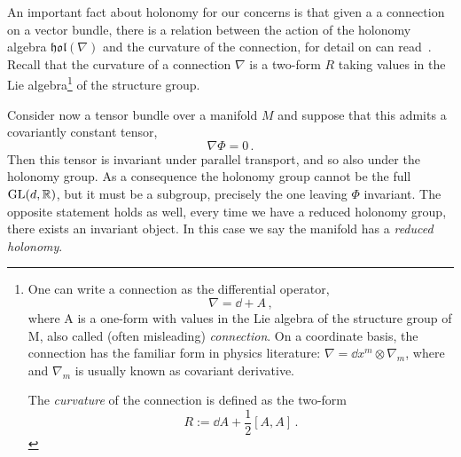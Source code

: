 \documentclass[debug]{phd}
\begin{document}
					An important fact about holonomy for our concerns is that given a a connection on a vector bundle, there is a relation between the action of the holonomy algebra $\mathfrak{hol}(\nabla)$ and the curvature of the connection, for detail on can read~\cite{holon2}.
					Recall that the curvature of a connection $\nabla$ is a two-form $R$ taking values in the Lie algebra\footnote{%
						One can write a connection as the differential operator,
								\begin{equation*}
									\nabla = \dd + A \, ,
								\end{equation*}
						where A is a one-form with values in the Lie algebra of the structure group of M, also called (often misleading) \emph{connection}.
						On a coordinate basis, the connection has the familiar form in physics literature: $\nabla = \dd x^m \otimes \nabla_m$, where and $\nabla_m$ is usually known as covariant derivative.
						
						The \emph{curvature} of the connection is defined as the two-form
							\begin{equation*}
								R := \dd A + \frac{1}{2} \left[A , A\right]\, .
							\end{equation*}
						}
					of the structure group.
					
					Consider now a tensor bundle over a manifold $M$ and suppose that this admits a covariantly constant tensor,
							\begin{equation*}
								\nabla \Phi = 0\, .
							\end{equation*}
					Then this tensor is invariant under parallel transport, and so also under the holonomy group.
					As a consequence the holonomy group cannot be the full $\mathrm{GL}(d, \mathbb{R})$, but it must be a subgroup, precisely the one leaving $\Phi$ invariant.
					The opposite statement holds as well, every time we have a reduced holonomy group, there exists an invariant object.
					In this case we say the manifold has a \emph{reduced holonomy}.
					
\end{document}
